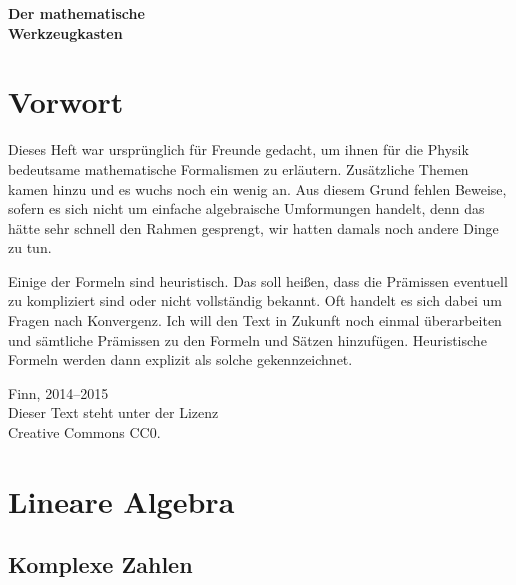 \documentclass[a4paper,11pt,fleqn,twocolumn,twoside]{scrartcl}
\numberwithin{equation}{section}
\begin{document}
\thispagestyle{empty}

\begin{huge}
\noindent
\textbf{Der mathematische\\
Werkzeugkasten}
\par
\end{huge}

\section*{Vorwort}
Dieses Heft war ursprünglich für Freunde gedacht, um ihnen
für die Physik bedeutsame mathematische Formalismen zu erläutern.
Zusätzliche Themen kamen hinzu und es wuchs noch ein wenig an. Aus
diesem Grund fehlen Beweise, sofern es sich nicht um einfache
algebraische Umformungen handelt, denn das hätte sehr schnell
den Rahmen gesprengt, wir hatten damals noch andere Dinge zu tun.

Einige der Formeln sind heuristisch. Das soll heißen, dass die
Prämissen eventuell zu kompliziert sind oder nicht vollständig
bekannt. Oft handelt es sich dabei um Fragen nach Konvergenz.
Ich will den Text in Zukunft noch einmal überarbeiten und sämtliche
Prämissen zu den Formeln und Sätzen hinzufügen. Heuristische Formeln
werden dann explizit als solche gekennzeichnet.

\tableofcontents



\vfill\noindent
Finn, 2014--2015\\
Dieser Text steht unter der Lizenz\\
Creative Commons CC0.



\newpage
\section{Lineare Algebra}
\subsection{Komplexe Zahlen}
\end{document}
